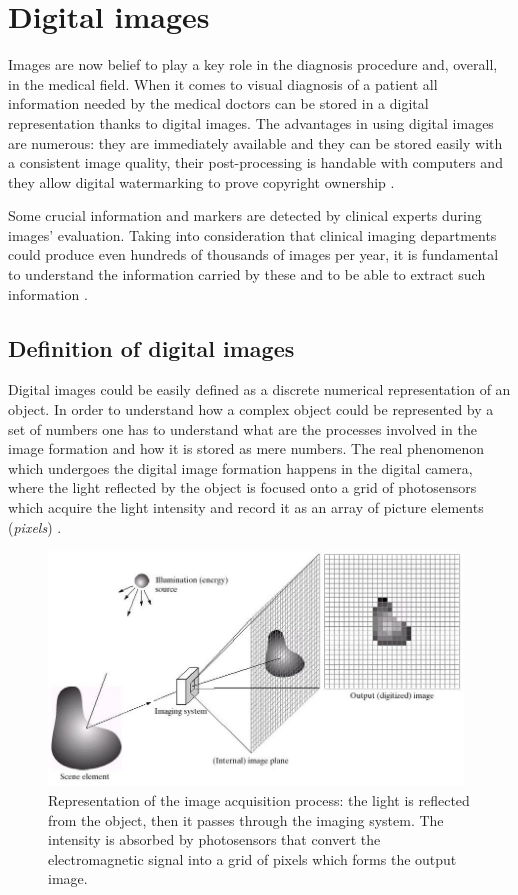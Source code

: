 \documentclass[../main.tex]{subfiles}
\begin{document}
\section{Digital images}
Images are now belief to play a key role in the diagnosis procedure and, overall, in the medical field. When it comes to visual diagnosis of a patient all information needed by the medical doctors can be stored in a digital representation thanks to digital images. 
The advantages in using digital images are numerous: they are immediately available and they can be stored easily with a consistent image quality, their post-processing is handable with computers and they allow digital watermarking to prove copyright ownership \cite{journal_of_dermatology}.  

Some crucial information and markers are detected by clinical experts during images' evaluation. Taking into consideration that clinical imaging departments could produce even hundreds of thousands of images per year, it is fundamental to understand the information carried by these and to be able to extract such information \cite{info_in_images}.

\subsection{Definition of digital images}\label{sec:definition-of-images}

Digital images could be easily defined as a discrete numerical representation of an object. In order to understand how a complex object could be represented by a set of numbers one has to understand what are the processes involved in the image formation and how it is stored as mere numbers.
The real phenomenon which undergoes the digital image formation happens in the digital camera, where the light reflected by the object is focused onto a grid of photosensors which acquire the light intensity and record it as an array of picture elements (\textit{pixels}) \cite{bourne2010fundamentals}.

\begin{figure}[H] 
\begin{center}
\includegraphics[width=11cm]{images/Image-Acquisition-Model.png}
\caption{\small{Representation of the image acquisition process: the light is reflected from the object, then it passes through the imaging system. The intensity is absorbed by photosensors that convert the electromagnetic signal into a grid of pixels which forms the output image.\cite{CNN_chapter13}}}\label{fig:Image_acquisition}
\end{center}
\end{figure}
\end{document}
